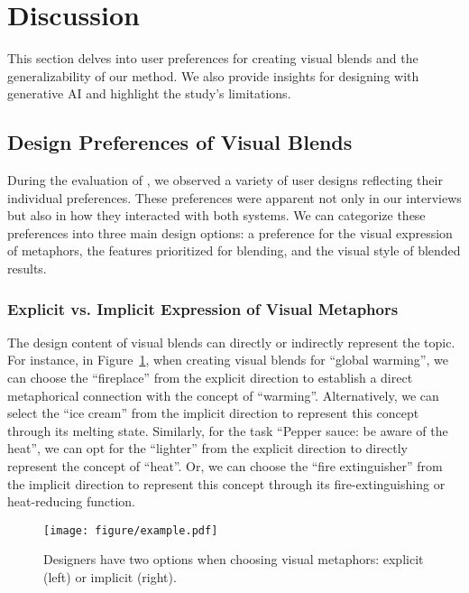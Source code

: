 \section{Discussion}



This section delves into user preferences for creating visual blends and the generalizability of our method. We also provide insights for designing with generative AI and highlight the study's limitations.



\subsection{Design Preferences of Visual Blends}



During the evaluation of \sysname, we observed a variety of user designs reflecting their individual preferences.
These preferences were apparent not only in our interviews but also in how they interacted with both systems. 
We can categorize these preferences into three main design options: a preference for the visual expression of metaphors, the features prioritized for blending, and the visual style of blended results.




\subsubsection{Explicit vs. Implicit Expression of Visual Metaphors}





The design content of visual blends can directly or indirectly represent the topic.
For instance, in Figure~\ref{fig:direction}, when creating visual blends for ``global warming'', we can choose the ``fireplace'' from the explicit direction to establish a direct metaphorical connection with the concept of ``warming''. Alternatively, we can select the ``ice cream'' from the implicit direction to represent this concept through its melting state. Similarly, for the task ``Pepper sauce: be aware of the heat'', we can opt for the ``lighter'' from the explicit direction to directly represent the concept of ``heat''. Or, we can choose the ``fire extinguisher'' from the implicit direction to represent this concept through its fire-extinguishing or heat-reducing function.


\begin{figure}[t]
  \centering
  \texttt{[image: figure/example.pdf]}
  \caption{Designers have two options when choosing visual metaphors: explicit (left) or implicit (right).
  }
  \label{fig:direction}
\end{figure}


